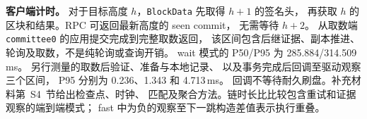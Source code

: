 \noindent\textbf{客户端计时。}
对于目标高度 $h$，\texttt{BlockData} 先取得 $h+1$ 的签名头，
再获取 $h$ 的区块和结果。RPC 可返回最新高度的 seen commit，
无需等待 $h+2$。
从取数端 \texttt{committee0} 的应用提交完成到完整取数返回，
该区间包含后继证据、副本推进、轮询及取数，不是纯轮询或查询开销。
wait 模式的 P50/P95 为 285.884/314.509\,ms。
另行测量的取数后验证、准备与本地记录、
以及事务完成后回调至驱动观察三个区间，
P95 分别为 0.236、1.343 和 4.713\,ms。
回调不等待耐久刷盘。补充材料第~S4~节给出检查点、时钟、
匹配及聚合方法。链时长比比较包含重试和证据观察的端到端模式；
fast 中为负的观察至下一跳构造差值表示执行重叠。